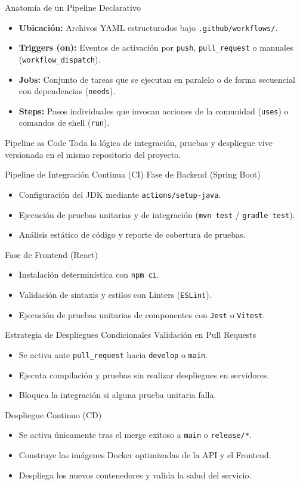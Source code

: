 \documentclass[aspectratio=169]{beamer}
\begin{document}
\contentSlideBulletCard
  {Anatomía de un Pipeline Declarativo}
  {
    \begin{itemize}
      \item \textbf{Ubicación:} Archivos YAML estructurados bajo \texttt{.github/workflows/}.
      \item \textbf{Triggers (on):} Eventos de activación por \texttt{push}, \texttt{pull\_request} o manuales (\texttt{workflow\_dispatch}).
      \item \textbf{Jobs:} Conjunto de tareas que se ejecutan en paralelo o de forma secuencial con dependencias (\texttt{needs}).
      \item \textbf{Steps:} Pasos individuales que invocan acciones de la comunidad (\texttt{uses}) o comandos de shell (\texttt{run}).
    \end{itemize}
  }
  {Pipeline as Code}
  {Toda la lógica de integración, pruebas y despliegue vive versionada en el mismo repositorio del proyecto.}

\contentSlideTwoCols
  {Pipeline de Integración Continua (CI)}
  {Fase de Backend (Spring Boot)}
  {
    \begin{itemize}
      \item Configuración del JDK mediante \texttt{actions/setup-java}.
      \item Ejecución de pruebas unitarias y de integración (\texttt{mvn test} / \texttt{gradle test}).
      \item Análisis estático de código y reporte de cobertura de pruebas.
    \end{itemize}
  }
  {Fase de Frontend (React)}
  {
    \begin{itemize}
      \item Instalación determinística con \texttt{npm ci}.
      \item Validación de sintaxis y estilos con Linters (\texttt{ESLint}).
      \item Ejecución de pruebas unitarias de componentes con \texttt{Jest} o \texttt{Vitest}.
    \end{itemize}
  }

\contentSlideTwoCols
  {Estrategia de Despliegues Condicionales}
  {Validación en Pull Requests}
  {
    \begin{itemize}
      \item Se activa ante \texttt{pull\_request} hacia \texttt{develop} o \texttt{main}.
      \item Ejecuta compilación y pruebas sin realizar despliegues en servidores.
      \item Bloquea la integración si alguna prueba unitaria falla.
    \end{itemize}
  }
  {Despliegue Continuo (CD)}
  {
    \begin{itemize}
      \item Se activa únicamente tras el merge exitoso a \texttt{main} o \texttt{release/*}.
      \item Construye las imágenes Docker optimizadas de la API y el Frontend.
      \item Despliega los nuevos contenedores y valida la salud del servicio.
    \end{itemize}
  }
\end{document}
